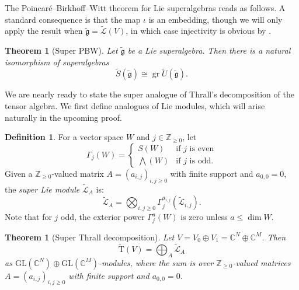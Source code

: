\documentclass[11pt]{article}
\newtheorem{thm}[theo]{Theorem}
\theoremstyle{definition}
\newtheorem{defi}[theo]{Definition}
\numberwithin{equation}{section}
\DeclareMathOperator{\gr}{gr}
\newcommand\CC{\mathbb{C}}
\newcommand\ZZ{\mathbb{Z}}
\newcommand{\fgtil}{\widetilde{\mathfrak{g}}}
\newcommand\GL{\mathrm{GL}}
\newcommand\Trm{\mathrm{T}}
\newcommand\Ltil{\widetilde{\mathcal{L}}}
\newcommand\Stil{\widetilde{S}}
\newcommand\Util{\widetilde{U}}
\newcommand\Trmtil{\widetilde{\Trm}}
\begin{document}
The Poincar\'e--Birkhoff--Witt theorem for Lie superalgebras reads as follows. A standard consequence is that the map $\iota$ is an embedding, though we will only apply the result when $\fgtil = \Ltil(V)$, in which case injectivity is obvious by .

\begin{thm}[Super PBW]
   Let $\fgtil$ be a Lie superalgebra. Then there is a natural isomorphism of superalgebras
     \[ \Stil(\fgtil) \cong \gr \Util(\fgtil). \]
\end{thm}

We are nearly ready to state the super analogue of Thrall's decomposition of the tensor algebra. We first define analogues of Lie modules, which will arise naturally in the upcoming proof.

\begin{defi}\label{def:super-Lie}
    For a vector space $W$ and $j \in \ZZ_{\geq 0}$, let
    \[
    \Gamma_j(W) =
    \begin{cases}
        S(W) & \text{if $j$ is even} \\
        \bigwedge(W) & \text{if $j$ is odd}.
    \end{cases}
    \]
    Given a $\ZZ_{\ge 0}$-valued matrix $A = (a_{i,j})_{i,j \ge 0}$ with finite support and $a_{0,0} = 0$, the \emph{super Lie module} $\Ltil_A$ is:
    \begin{equation}\label{eq:super-higher-lie}
    \Ltil_A = \bigotimes_{i,j \ge 0} \Gamma_j^{a_{i,j}}(\Ltil_{i,j}).
    \end{equation}
    Note that for $j$ odd, the exterior power $\Gamma_j^a(W)$ is zero unless $a \leq \dim W$.
\end{defi}

\begin{thm}[Super Thrall decomposition]\label{thm:super-Thrall}
    Let $V = V_0 \oplus V_1 = \CC^N \oplus \CC^M$. Then
      \[ \Trmtil(V) = \bigoplus_A \Ltil_A \]
    as $\GL(\CC^N) \oplus \GL(\CC^M)$-modules, where the sum is over $\ZZ_{\geq 0}$-valued matrices $A = (a_{i,j})_{i,j \geq 0}$ with finite support and $a_{0,0} = 0$.
\end{thm}
\end{document}
